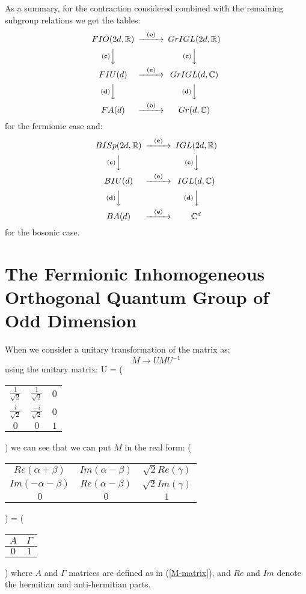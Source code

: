 As a summary, for the contraction considered combined with the
remaining subgroup relations we get the tables:
\[
\begin{CD}
{FIO(2d, \IR)} @>{\bf (e)}>> {GrIGL(2d, \IR)} \\
@V{\bf (c)}VV @V{\bf (c)}VV \\
{FIU(d)} @>{\bf (e)}>> {GrIGL(d, \IC)} \\
@V{\bf (d)}VV @V{\bf (d)}VV \\
{FA(d)} @>{\bf (e)}>> {Gr(d, \IC)}
\end{CD}
\]
for the fermionic case and:
\[
\begin{CD}
{BISp(2d, \IR)} @>{\bf (e)}>> {IGL(2d, \IR)} \\
@V{\bf (c)}VV @V{\bf (c)}VV \\
{BIU(d)} @>{\bf (e)}>> {IGL(d, \IC)} \\
@V{\bf (d)}VV @V{\bf (d)}VV \\
{BA(d)} @>{\bf (e)}>> {\IC^d}
\end{CD}
\]
for the bosonic case.

\section{The Fermionic Inhomogeneous
Orthogonal Quantum Group of Odd Dimension}

When we consider a unitary transformation of the \FIO matrix as:
\[
M \rightarrow UMU^{-1}
\]
using the unitary matrix: \beq U = \left(
\begin{tabular}{cc|c}
$\frac{1}{\sqrt{2}}$ & $\frac{1}{\sqrt{2}}$ & $0$ \\
$\frac{i}{\sqrt{2}}$ & $\frac{-i}{\sqrt{2}}$ & $0$ \\
\hline $0$ & $0$ & $1$
\end{tabular}
\right) \eeq we can see that we can put $M$ in the real form: \beq
\left(
\begin{tabular}{cc|c}
$Re(\alpha + \beta)$ & $Im(\alpha - \beta)$ & $\sqrt{2}Re(\gamma)$ \\
$Im(-\alpha - \beta)$ & $Re(\alpha - \beta)$ & $\sqrt{2}Im(\gamma)$ \\
\hline $0$ & $0$ & $1$
\end{tabular}
\right) = \left(
\begin{tabular}{c|c}
$A$ & $\Gamma$ \\
\hline $0$ & $1$
\end{tabular}
\right) \eeq where $A$ and $\Gamma$ matrices are defined as in
(\ref{M-matrix}), and $Re$ and $Im$ denote the hermitian and
anti-hermitian parts.

